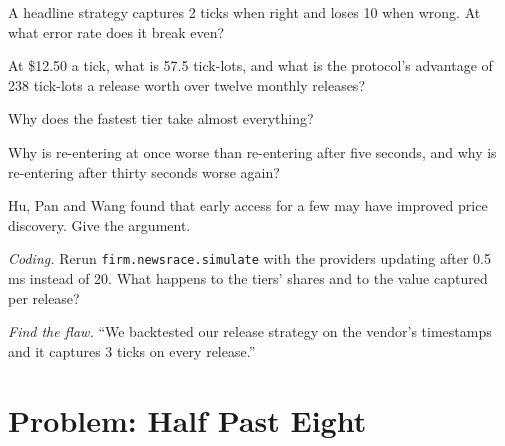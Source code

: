 \begin{exercise}[$\star$]\label{exo:hf:news-and-event-trading:2}
A headline strategy captures 2 ticks when right and loses 10 when wrong. At what error rate does it break even?
\end{exercise}

\begin{exercise}[$\star$]\label{exo:hf:news-and-event-trading:3}
At \$12.50 a tick, what is 57.5 tick-lots, and what is the protocol's advantage of 238 tick-lots a release worth over twelve monthly releases?
\end{exercise}

\begin{exercise}[$\star\star$]\label{exo:hf:news-and-event-trading:4}
Why does the fastest tier take almost everything?
\end{exercise}

\begin{exercise}[$\star\star$]\label{exo:hf:news-and-event-trading:5}
Why is re-entering at once worse than re-entering after five seconds, and why is re-entering after thirty seconds worse again?
\end{exercise}

\begin{exercise}[$\star\star$]\label{exo:hf:news-and-event-trading:6}
Hu, Pan and Wang found that early access for a few may have improved price discovery. Give the argument.
\end{exercise}

\begin{exercise}[$\star\star\star$]\label{exo:hf:news-and-event-trading:7}
\emph{Coding.} Rerun \texttt{firm.newsrace.simulate} with the providers updating after 0.5 ms instead of 20. What happens to the tiers' shares and to
the value captured per release?
\end{exercise}

\begin{exercise}[$\star\star\star$]\label{exo:hf:news-and-event-trading:8}
\emph{Find the flaw.} ``We backtested our release strategy on the vendor's timestamps and it captures 3 ticks on every release.''
\end{exercise}

\section{Problem: Half Past Eight}


